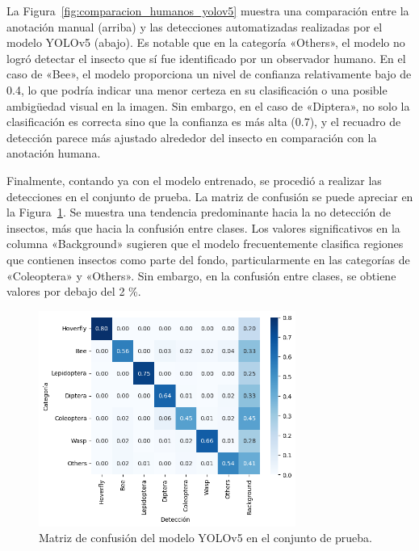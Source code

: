La Figura~\ref{fig:comparacion_humanos_yolov5} muestra una comparación entre la anotación manual (arriba) y las detecciones automatizadas realizadas por el modelo YOLOv5 (abajo). Es notable que en la categoría «Others», el modelo no logró detectar el insecto que sí fue identificado por un observador humano. En el caso de «Bee», el modelo proporciona un nivel de confianza relativamente bajo de 0.4, lo que podría indicar una menor certeza en su clasificación o una posible ambigüedad visual en la imagen. Sin embargo, en el caso de «Diptera», no solo la clasificación es correcta sino que la confianza es más alta (0.7), y el recuadro de detección parece más ajustado alrededor del insecto en comparación con la anotación humana. 

Finalmente, contando ya con el modelo entrenado, se procedió a realizar las detecciones en el conjunto de prueba. La matriz de confusión se puede apreciar en la Figura~\ref{fig:matriz_confusion_yolov5_prueba}. Se muestra una tendencia predominante hacia la no detección de insectos, más que hacia la confusión entre clases. Los valores significativos en la columna «Background» sugieren que el modelo frecuentemente clasifica regiones que contienen insectos como parte del fondo, particularmente en las categorías de «Coleoptera» y «Others». Sin embargo, en la confusión entre clases, se obtiene valores por debajo del 2 \%.

\begin{figure}[H]
    \centering
    \includegraphics[width=0.75\textwidth]{Figuras/test_yolov5m_v01.png}
    \caption{Matriz de confusión del modelo YOLOv5 en el conjunto de prueba.}
    \label{fig:matriz_confusion_yolov5_prueba}
\end{figure}

